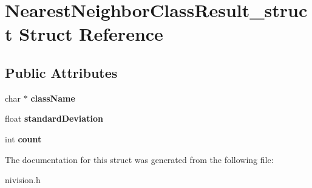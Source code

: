 \hypertarget{structNearestNeighborClassResult__struct}{\section{\-Nearest\-Neighbor\-Class\-Result\-\_\-struct \-Struct \-Reference}
\label{structNearestNeighborClassResult__struct}
}
\subsection*{\-Public \-Attributes}
\begin{DoxyCompactItemize}
\item 
\hypertarget{structNearestNeighborClassResult__struct_a99609f31f19c205e1dede4235624527c}{char $\ast$ {\bfseries class\-Name}}\label{structNearestNeighborClassResult__struct_a99609f31f19c205e1dede4235624527c}

\item 
\hypertarget{structNearestNeighborClassResult__struct_a3adf2e959355eee783d76ced243311d6}{float {\bfseries standard\-Deviation}}\label{structNearestNeighborClassResult__struct_a3adf2e959355eee783d76ced243311d6}

\item 
\hypertarget{structNearestNeighborClassResult__struct_a7cbfe00730d71e78cdad9cc9fb826be8}{int {\bfseries count}}\label{structNearestNeighborClassResult__struct_a7cbfe00730d71e78cdad9cc9fb826be8}

\end{DoxyCompactItemize}


\-The documentation for this struct was generated from the following file\-:\begin{DoxyCompactItemize}
\item 
nivision.\-h\end{DoxyCompactItemize}
